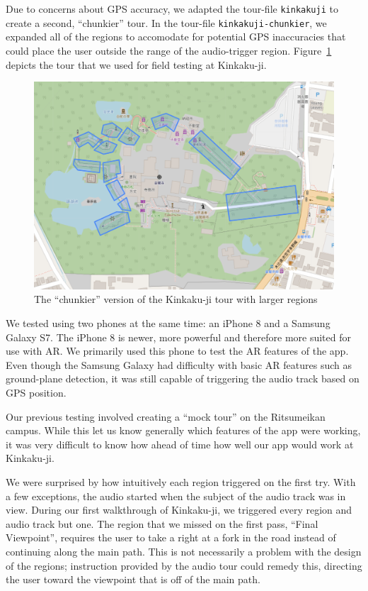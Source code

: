 \documentclass[a4paper, 10pt, american, titlepage]{article}
\begin{document}
Due to concerns about GPS accuracy, we adapted the tour-file \texttt{kinkakuji}
to create a second, ``chunkier'' tour.  In the tour-file
\texttt{kinkakuji-chunkier}, we expanded all of the regions to accomodate for
potential GPS inaccuracies that could place the user outside the range of the
audio-trigger region.  Figure~\ref{fig:kinkakujiChunkierTour} depicts the tour
that we used for field testing at Kinkaku-ji.

\begin{figure}[h]
	\centering
	\includegraphics[width=\textwidth]{kinkakuji-chunkier-tour.png}
	\caption[The ``chunkier'' version of the Kinkaku-ji tour]{The ``chunkier''
		version of the Kinkaku-ji tour with larger regions}
	\label{fig:kinkakujiChunkierTour}
\end{figure}

We tested using two phones at the same time: an iPhone 8 and a Samsung Galaxy
S7. The iPhone 8 is newer, more powerful and therefore more suited for use with
AR. We primarily used this phone to test the AR features of the app. Even
though the Samsung Galaxy had difficulty with basic AR features such as
ground-plane detection, it was still capable of triggering the audio track
based on GPS position.

Our previous testing involved creating a ``mock tour'' on the Ritsumeikan
campus. While this let us know generally which features of the app were working,
it was very difficult to know how ahead of time how well our app would work at
Kinkaku-ji.

We were surprised by how intuitively each region triggered on the first try.
With a few exceptions, the audio started when the subject of the audio track
was in view. During our first walkthrough of Kinkaku-ji, we triggered every
region and audio track but one. The region that we missed on the first pass,
``Final Viewpoint'', requires the user to take a right at a fork in the road
instead of continuing along the main path. This is not necessarily a problem
with the design of the regions; instruction provided by the audio tour could
remedy this, directing the user toward the viewpoint that is off of the main
path.
\end{document}
